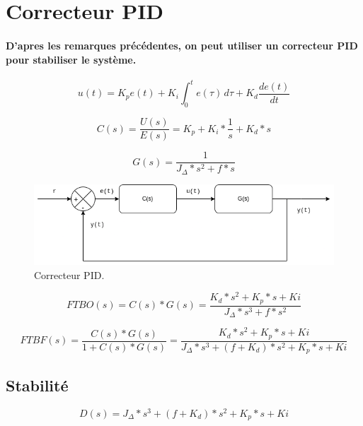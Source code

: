 \section{Correcteur PID}

\paragraph{D'apres les remarques précédentes, on peut utiliser un correcteur PID pour stabiliser le système.}

\begin{equation}
	u(t) = K_p e(t) + K_i \int_{0}^{t} e(\tau) \,d\tau + K_d \frac{de(t)}{dt}
\end{equation}

\begin{equation}
	C(s) = \frac{U(s)}{E(s)} = K_p + K_i * \frac{1}{s} + K_d * s
\end{equation}

\begin{equation}
	G(s) = \frac{1}{J_\Delta * s^2 + f * s}
\end{equation}

\begin{figure}[!htpb]
	\centering
	\includegraphics[width=\linewidth]{Figures/sys+correcteur.png}
	\caption{Correcteur PID.}
\end{figure}

\begin{equation}
	FTBO(s) = C(s) * G(s) = \frac{K_d * s^2 + K_p * s + Ki}{J_\Delta * s^3 + f * s^2}
\end{equation}

\begin{equation}
	FTBF(s) = \frac{C(s) * G(s)}{1 + C(s) * G(s)} = \frac{K_d * s^2 + K_p * s + Ki}{J_\Delta * s^3 + (f + K_d) * s^2 + K_p * s + Ki}
\end{equation}

\subsection{Stabilité}

\begin{equation}
	D(s) = J_\Delta * s^3 + (f + K_d) * s^2 + K_p * s + Ki
\end{equation}

